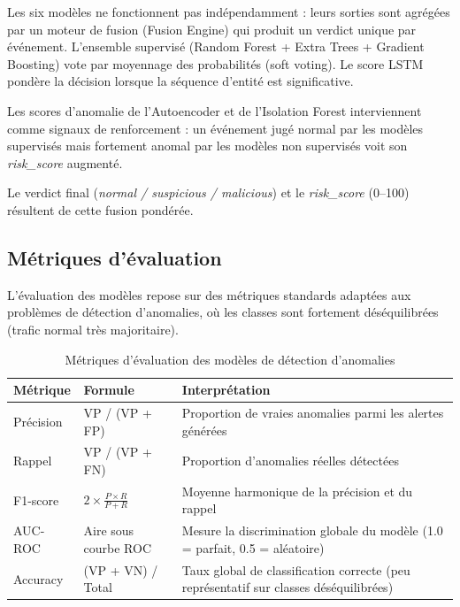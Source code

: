 \documentclass[12pt,a4paper,oneside]{report}
\begin{document}
	Les six modèles ne fonctionnent pas indépendamment : leurs sorties sont agrégées par un moteur de fusion (Fusion Engine) qui produit un verdict unique par événement. L'ensemble supervisé (Random Forest + Extra Trees + Gradient Boosting) vote par moyennage des probabilités (soft voting). Le score LSTM pondère la décision lorsque la séquence d'entité est significative.
	
	Les scores d'anomalie de l'Autoencoder et de l'Isolation Forest interviennent comme signaux de renforcement : un événement jugé normal par les modèles supervisés mais fortement anomal par les modèles non supervisés voit son \textit{risk\_score} augmenté.
	
	Le verdict final (\textit{normal / suspicious / malicious}) et le \textit{risk\_score} (0--100) résultent de cette fusion pondérée.
	
	\subsection{Métriques d'évaluation}
	
	L'évaluation des modèles repose sur des métriques standards adaptées aux problèmes de détection d'anomalies, où les classes sont fortement déséquilibrées (trafic normal très majoritaire).
	
	\begin{table}[h!]
		\centering
		\caption{Métriques d'évaluation des modèles de détection d'anomalies}
		\begin{tabular}{|l|l|p{8cm}|}
			\hline
			\textbf{Métrique} & \textbf{Formule} & \textbf{Interprétation} \\
			\hline
			
			Précision & VP / (VP + FP) & Proportion de vraies anomalies parmi les alertes générées \\
			\hline
			
			Rappel & VP / (VP + FN) & Proportion d'anomalies réelles détectées \\
			\hline
			
			F1-score & $2 \times \frac{P \times R}{P + R}$ & Moyenne harmonique de la précision et du rappel \\
			\hline
			
			AUC-ROC & Aire sous courbe ROC & Mesure la discrimination globale du modèle (1.0 = parfait, 0.5 = aléatoire) \\
			\hline
			
			Accuracy & (VP + VN) / Total & Taux global de classification correcte (peu représentatif sur classes déséquilibrées) \\
			\hline
			
		\end{tabular}
	\end{table}
	
\end{document}
